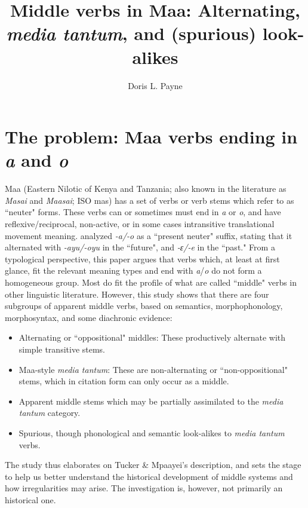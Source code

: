 \documentclass[output=paper,colorlinks,citecolor=brown
]{langscibook}
\author{Doris L. Payne\affiliation{University of Oregon \& SIL Global}}
\title{Middle verbs in Maa: Alternating, \textit{media tantum}, and (spurious) look-alikes}
\begin{document}
\maketitle

\section{The problem: Maa verbs ending in \textit{a} and \textit{o}}
Maa (Eastern Nilotic of Kenya and Tanzania; also known in the literature as \textit{Masai} and \textit{Maasai}; ISO mas) has a set of verbs or verb stems which \citet[134-139]{TuckerMpaayei1955} refer to as ``neuter" forms. These verbs can or sometimes must end in \textit{a} or \textit{o}, and have reflexive/reciprocal, non-active, or in some cases intransitive translational movement meaning. \citet[134]{TuckerMpaayei1955} analyzed \textit{-a/-o} as a ``present neuter" suffix, stating that it alternated with \textit{-ayu/-oyu} in the ``future", and \textit{-ɛ/-e} in the ``past." From a typological perspective, this paper argues that verbs which, at least at first glance, fit the relevant meaning types and end with \textit{a}/\textit{o} do not form a homogeneous group. Most do fit the profile of what are called ``middle" verbs in other linguistic literature. However, this study shows that there are four subgroups of apparent middle verbs, based on semantics, morphophonology, morphosyntax, and some diachronic evidence:

\begin{itemize}
\item Alternating or ``oppositional" \citep{Grestenberger2018, Inglese2022b, Inglese2022a} middles: These productively alternate with simple transitive stems.  
\item Maa-style \textit{media tantum}: These are non-alternating or ``non-oppositional" stems, which in citation form can only occur as a middle.
\item Apparent middle stems which may be partially assimilated to the \textit{media tantum} category.
\item Spurious, though phonological and semantic look-alikes to \textit{media tantum} verbs.
\end{itemize}

The study thus elaborates on Tucker \& Mpaayei's description, and sets the stage to help us better understand the historical development of middle systems and how irregularities may arise. The investigation is, however, not primarily an historical one. 
\end{document}
